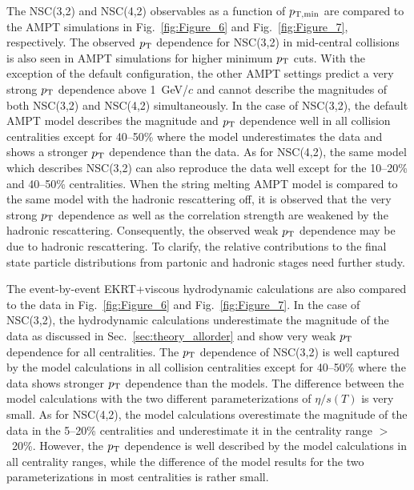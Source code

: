 The NSC(3,2) and NSC(4,2) observables as a function of $p_{\rm T, min}$ are compared to the {AMPT} simulations in Fig.~\ref{fig:Figure_6} and Fig.~\ref{fig:Figure_7}, respectively.
The observed $p_{\rm T}$ dependence for NSC(3,2) in mid-central collisions is also seen in AMPT simulations for higher minimum $p_{\rm T}$ cuts.
With the exception of the default configuration, the other AMPT settings predict a very strong $p_{\rm T}$ dependence above 1~GeV/$c$ and cannot describe the magnitudes of both NSC(3,2) and NSC(4,2) simultaneously.
In the case of NSC(3,2), the default AMPT model describes the magnitude and $p_{\rm T}$ dependence well in all collision centralities except for 40--50\% where the model underestimates the data and shows a stronger $p_{\rm T}$ dependence than the data.
As for  NSC(4,2), the same model which describes NSC(3,2) can also reproduce the data well except for the 10--20\% and 40--50\% centralities.
When the string melting AMPT model is compared to the same model with the hadronic rescattering off, it is observed that the very strong $p_{\rm T}$ dependence as well as the correlation strength are weakened by the hadronic rescattering.
Consequently, the observed weak $p_{\rm T}$ dependence may be due to hadronic rescattering. To clarify, the relative contributions to the final state particle distributions from partonic and hadronic stages need further study.

The event-by-event EKRT+viscous hydrodynamic calculations are also compared to the data in Fig.~\ref{fig:Figure_6} and Fig.~\ref{fig:Figure_7}.
In the case of NSC(3,2), the hydrodynamic calculations underestimate the magnitude of the data as discussed in Sec.~\ref{sec:theory_allorder} and show very weak $p_{\rm T}$ dependence for all centralities.
The $p_{\rm T}$ dependence of NSC(3,2) is well captured by the model calculations in all collision centralities except for 40--50\% where the data shows stronger $p_{\rm T}$ dependence than the models. The difference between the model calculations with the two different parameterizations of $\eta/s(T)$ is very small. 
As for NSC(4,2), the model calculations overestimate the magnitude of the data in the 5--20\% centralities and underestimate it in the centrality range $>$~20\%. However, the $p_{\rm T}$ dependence is well described by the model calculations in all centrality ranges, while the difference of the model results for the two parameterizations in most centralities is rather small.

